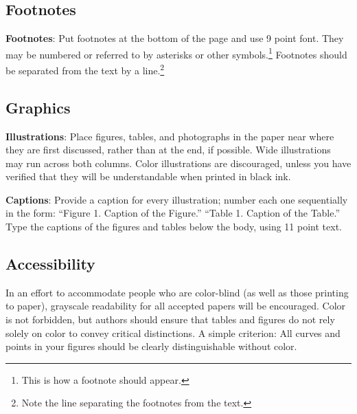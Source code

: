 \documentclass[11pt,a4paper]{article}
\begin{document}
\subsection{Footnotes}

{\bf Footnotes}: Put footnotes at the bottom of the page and use 9
point font. They may be numbered or referred to by asterisks or other
symbols.\footnote{This is how a footnote should appear.} Footnotes
should be separated from the text by a line.\footnote{Note the line
separating the footnotes from the text.}

\subsection{Graphics}

{\bf Illustrations}: Place figures, tables, and photographs in the
paper near where they are first discussed, rather than at the end, if
possible.  Wide illustrations may run across both columns.  Color
illustrations are discouraged, unless you have verified that  
they will be understandable when printed in black ink.

{\bf Captions}: Provide a caption for every illustration; number each one
sequentially in the form:  ``Figure 1. Caption of the Figure.'' ``Table 1.
Caption of the Table.''  Type the captions of the figures and 
tables below the body, using 11 point text.


\subsection{Accessibility}
\label{ssec:accessibility}

In an effort to accommodate people who are color-blind (as well as those printing
to paper), grayscale readability for all accepted papers will be
encouraged.  Color is not forbidden, but authors should ensure that
tables and figures do not rely solely on color to convey critical
distinctions. A simple criterion: All curves and points in your figures should be clearly distinguishable without color.


\end{document}
